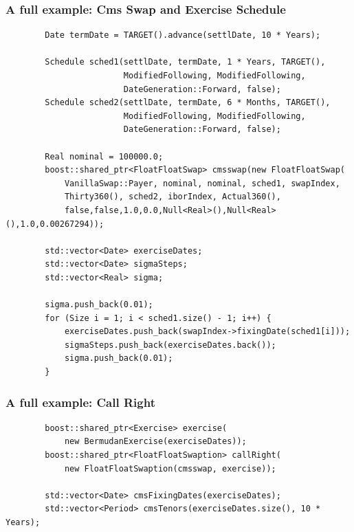 \documentclass{beamer}
\begin{document}
\begin{frame}[fragile]
\frametitle{A full example: Cms Swap and Exercise Schedule}
\begin{verbatim}
        Date termDate = TARGET().advance(settlDate, 10 * Years);

        Schedule sched1(settlDate, termDate, 1 * Years, TARGET(),
                        ModifiedFollowing, ModifiedFollowing,
                        DateGeneration::Forward, false);
        Schedule sched2(settlDate, termDate, 6 * Months, TARGET(),
                        ModifiedFollowing, ModifiedFollowing,
                        DateGeneration::Forward, false);

        Real nominal = 100000.0;
        boost::shared_ptr<FloatFloatSwap> cmsswap(new FloatFloatSwap(
            VanillaSwap::Payer, nominal, nominal, sched1, swapIndex,
            Thirty360(), sched2, iborIndex, Actual360(),
            false,false,1.0,0.0,Null<Real>(),Null<Real>(),1.0,0.00267294));

        std::vector<Date> exerciseDates;
        std::vector<Date> sigmaSteps;
        std::vector<Real> sigma;

        sigma.push_back(0.01);
        for (Size i = 1; i < sched1.size() - 1; i++) {
            exerciseDates.push_back(swapIndex->fixingDate(sched1[i]));
            sigmaSteps.push_back(exerciseDates.back());
            sigma.push_back(0.01);
        }
\end{verbatim}
\end{frame}

\begin{frame}[fragile]
\frametitle{A full example: Call Right}
\begin{verbatim}
        boost::shared_ptr<Exercise> exercise(
            new BermudanExercise(exerciseDates));
        boost::shared_ptr<FloatFloatSwaption> callRight(
            new FloatFloatSwaption(cmsswap, exercise));

        std::vector<Date> cmsFixingDates(exerciseDates);
        std::vector<Period> cmsTenors(exerciseDates.size(), 10 * Years);
\end{verbatim}
\end{frame}
\end{document}
